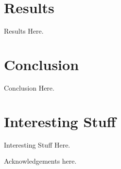 \documentclass{acmtog}
\begin{document}
\section{Results}
\label{sec:results}

Results Here.

\section{Conclusion}
\label{sec:conclusion}

Conclusion Here.

\appendix

\section{Interesting Stuff}

Interesting Stuff Here.

\begin{acks}

Acknowledgements here.

\end{acks}




\end{document}
